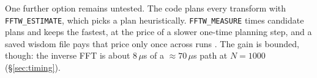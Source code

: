 One further option remains untested.  The code plans every transform with
\texttt{FFTW\_ESTIMATE}, which picks a plan heuristically.  \texttt{FFTW\_MEASURE} times
candidate plans and keeps the fastest, at the price of a slower one-time planning step,
and a saved wisdom file pays that price only once across runs \citep{frigo2005design}.
The gain is bounded, though: the inverse FFT is about $8\,\mu$s of a
$\approx 70\,\mu$s path at $N = 1000$ (§\ref{sec:timing}).
